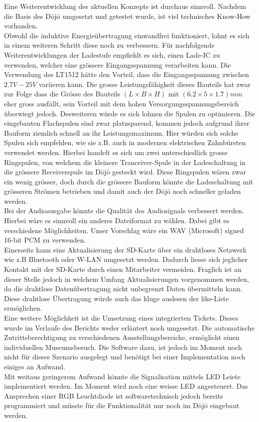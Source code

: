 Eine Weiterentwicklung des aktuellen Konzepts ist durchaus sinnvoll. Nachdem die Basis des Dōjō umgesetzt und getestet wurde, ist viel technisches \glqq Know-How \grqq vorhanden.\\
Obwohl die induktive Energieübertragung einwandfrei funktioniert, lohnt es sich in einem weiteren Schritt diese noch zu verbessern. Für nachfolgende Weiterentwicklungen der Ladestufe empfiehlt es sich, einen Lade-IC zu verwenden, welcher eine grössere Eingangsspannung verarbeiten kann. Die Verwendung des LT1512 hätte den Vorteil, dass die Eingangsspannung zwischen $2.7V - 25V$ variieren kann. Die grosse Leistungsfähigkeit dieses Bauteils hat zwar zur Folge dass die Grösse des Bauteils $(L \times B \times H)$ mit $(6.2\times 5\times 1.7)mm$ eher gross ausfällt, sein Vorteil mit dem hohen Versorgungsspannungsbereich überwiegt jedoch. Desweiteren würde es sich lohnen die Spulen zu optimieren. Die eingebauten Flachspulen sind zwar platzsparend, kommen jedoch aufgrund ihrer Bauform ziemlich schnell an ihr Leistungsmaximum. Hier würden sich solche Spulen sich empfehlen, wie sie z.B. auch in modernen elektrischen Zahnbürsten verwendet werden. Hierbei handelt es sich um zwei unterschiedlich grosse Ringspulen, von welchem die kleinere Tranceiver-Spule in der Ladeschaltung in die grössere Receiverspule  im Dōjō gesteckt wird. Diese Ringspulen wären zwar ein wenig grösser, doch durch die grössere Bauform könnte die Ladeschaltung mit grösseren Strömen betrieben und damit auch der Dōjō noch schneller geladen werden.\\
Bei der Audioausgabe könnte die Qualität des Audiosignals verbessert werden. Hierbei wäre es sinnvoll ein anderes Dateiformat zu wählen. Dabei gibt es verschiedene Möglichkeiten. Unser Vorschlag wäre ein WAV (Microsoft) signed 16-bit PCM zu verwenden.\\
Einerseits kann eine Aktualisierung der SD-Karte über ein drahtloses Netzwerk wie z.B Bluetooth oder W-LAN umgesetzt werden. Dadurch liesse sich jeglicher Kontakt mit der SD-Karte durch einen Mitarbeiter vermeiden. Fraglich ist an dieser Stelle jedoch in welchem Umfang Aktualisierungen vorgenommen werden, da die drahtlose Datenübertragung nicht unbegrenzt Daten übermitteln kann. Diese drahtlose Übertragung würde auch das kluge auslesen der like-Liste ermöglichen.\\
Eine weitere Möglichkeit ist die Umsetzung eines integrierten Tickets. Dieses wurde im Verlaufe des Berichts weder erläutert noch umgesetzt. Die automatische Zutrittsberechtigung zu verschiedenen Ausstellungsbereiche, ermöglicht einen individuellen Museumsbesuch. Die Software dazu, ist jedoch im Moment noch nicht für dieses Szenario ausgelegt und benötigt bei einer Implementation noch einiges an Aufwand.\\
Mit weitaus geringerem Aufwand könnte die Signalisation mittels LED Leiste implementiert werden. Im Moment wird noch eine weisse LED angesteuert. Das Ansprechen einer RGB Leuchtdiode ist softwaretechnisch jedoch bereits programmiert und müsste für die Funktionalität nur noch im Dōjō eingebaut werden.